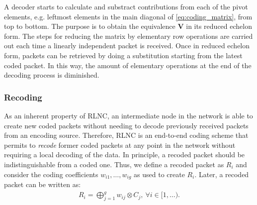 A decoder starts to calculate and substract contributions from each
of the pivot elements, e.g. leftmost elements in the main diagonal of
\eqref{eq:coding_matrix}, from top to bottom. The purpose is to obtain
the equivalence  $\textbf{V}$ in its reduced echelon form. The steps
for reducing the matrix by elementary row operations are carried out each time
a linearly independent packet is received. Once in reduced echelon form, packets
can be retrieved by doing a substitution starting from the latest
coded packet. In this way, the amount of elementary operations at the end
of the decoding process is diminished.

\subsubsection{Recoding}
As an inherent property of \ac{RLNC}, an intermediate node in the network
is able to create new coded packets without needing to decode previously
received packets from an encoding source. Therefore, \ac{RLNC} is an end-to-end
coding scheme that permits to \textit{recode} former coded packets at any
point in the network without requiring a local decoding of the data. In
principle, a recoded packet should be indistinguishable from a coded one.
Thus, we define a recoded packet as $R_i$ and consider the coding
coefficients $w_{i1}, \ldots, w_{ig}$ as used to
create $R_i$. Later, a recoded packet can be written as:
%
\begin{align}
\label{eq:recoded_packet}
R_i = \bigoplus_{j=1}^{g} w_{ij} \otimes C_j  ,\ \forall i \in [1,\ldots).
\end{align}

